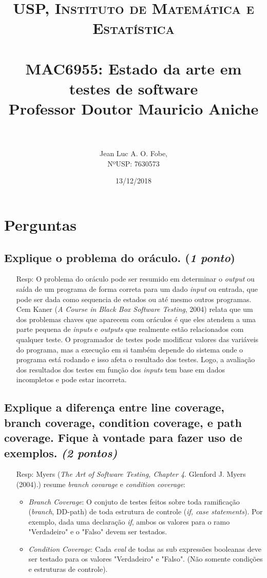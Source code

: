 \documentclass[paper=a4, fontsize=11pt]{scrartcl} %
\title{	
\normalfont \normalsize 
\textsc{USP, Instituto de Matemática e Estatística} \\ [25pt] %
\horrule{0.5pt} \\[0.4cm] %
\huge MAC6955: Estado da arte em testes de software \\ %
\normalfont \normalsize 
Professor Doutor Mauricio Aniche \\ [25pt]
\horrule{2pt} \\[0.5cm] %
}
\author{Jean Luc A. O. Fobe, \\
        NºUSP: 7630573} %
\date{13/12/2018} %
\numberwithin{equation}{section} %
\numberwithin{figure}{section} %
\numberwithin{table}{section} %
\begin{document}
\maketitle %

\section{Perguntas}
\subsection{Explique o problema do oráculo. (\textit{1 ponto})}
\begin{itemize}
    \item[Resp:] O problema do oráculo pode ser resumido em determinar o \textit{output} ou saída de um programa de forma correta para um dado \textit{input} ou entrada, que pode ser dada como sequencia de estados ou até mesmo outros programas.\\
    Cem Kaner (\textit{A Course in Black Box Software Testing}, 2004) relata que um dos problemas chaves que aparecem com oráculos é que eles atendem a uma parte pequena de \textit{inputs} e \textit{outputs} que realmente estão relacionados com qualquer teste. O programador de testes pode modificar valores das variáveis do programa, mas a execução em si também depende do sistema onde o programa está rodando e isso afeta o resultado dos testes. Logo, a avaliação dos resultados dos testes em função dos \textit{inputs} tem base em dados incompletos e pode estar incorreta.
\end{itemize}

\subsection{Explique a diferença entre line coverage, branch coverage, condition coverage, e path coverage. Fique à vontade para fazer uso de exemplos. \textit{(2 pontos)}}
    \begin{itemize}
        \item[Resp:] Myers (\textit{The Art of Software Testing, Chapter 4}. Glenford J. Myers (2004).) resume \textit{branch covarage} e \textit{condition coverage}:
        \begin{itemize}
            \item \textit{Branch Coverage}: O conjuto de testes feitos sobre toda ramificação (\textit{branch}, DD-path) de toda estrutura de controle (\textit{if, case statements}). Por exemplo, dada uma declaração \textit{if}, ambos os valores para o ramo "Verdadeiro" e o "Falso" devem ser testados.
            \item \textit{Condition Coverage}: Cada \textit{eval} de todas as sub expressões booleanas deve ser testado para os valores "Verdadeiro" e "Falso". (Não somente condições e estruturas de controle).
            \end{itemize}
    \end{itemize}
\end{document}

